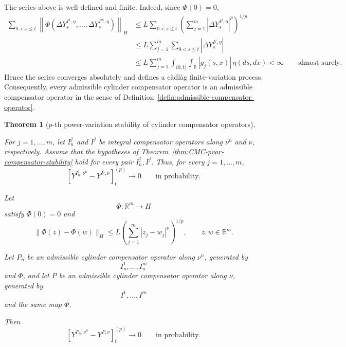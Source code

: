 \documentclass[a4paper,10pt]{article}
\newtheorem{thm}{Theorem}[section]
\begin{document}
The series above is well-defined and finite. Indeed, since \(\Phi(0)=0\),
\[
\begin{aligned}
\sum_{0<s\le t}
\left\lVert
\Phi\left(
        \Delta Y_s^{I^1,\eta},
        \ldots,
        \Delta Y_s^{I^m,\eta}
\right)
\right\rVert_H
&\le
L
\sum_{0<s\le t}
\left(
        \sum_{j=1}^m
        |\Delta Y_s^{I^j,\eta}|^p
\right)^{1/p}
\\
&\le
L
\sum_{j=1}^m
\sum_{0<s\le t}
|\Delta Y_s^{I^j,\eta}|
\\
&\le
L
\sum_{j=1}^m
\int_{(0,t]}\int_{\mathbb R}
|g_j(s,x)|\,\eta(ds,dx)
<\infty
\qquad\text{almost surely}.
\end{aligned}
\]
Hence the series converges absolutely and defines a càdlàg
finite-variation process.
Consequently, every admissible cylinder compensator operator is an
admissible compensator operator in the sense of
Definition~\ref{defin:admissible-compensator-operator}.

\begin{thm}
[\(p\)-th power-variation stability of cylinder compensator operators]
\label{thm:cylinder-total-p-variation-stability}

For \(j=1,\ldots,m\), let \(I_n^j\) and \(I^j\) be integral
compensator operators along \(\nu^n\) and \(\nu\), respectively.
Assume that the hypotheses of
Theorem~\ref{thm:CMC-pvar-compensator-stability}
hold for every pair \(I_n^j,I^j\). Thus, for every
\(j=1,\ldots,m\),
\[
\left[
Y^{I_n^j,\nu^n}-Y^{I^j,\nu}
\right]^{(p)}_t
\longrightarrow0
\qquad\text{in probability}.
\]

Let
\[
        \Phi:\mathbb R^m\longrightarrow H
\]
satisfy \(\Phi(0)=0\) and
\[
        \lVert\Phi(z)-\Phi(w)\rVert_H
        \le
        L
        \left(
        \sum_{j=1}^m|z_j-w_j|^p
        \right)^{1/p},
        \qquad z,w\in\mathbb R^m.
\]

Let \(P_n\) be an admissible cylinder compensator operator along
\(\nu^n\), generated by
\[
        I_n^1,\ldots,I_n^m
\]
and \(\Phi\), and let \(P\) be an admissible cylinder compensator
operator along \(\nu\), generated by
\[
        I^1,\ldots,I^m
\]
and the same map \(\Phi\).

Then
\[
        [Y^{P_n,\nu^n}-Y^{P,\nu}]^{(p)}_t
        \longrightarrow0
        \qquad\text{in probability}.
\]
\end{thm}
\end{document}
